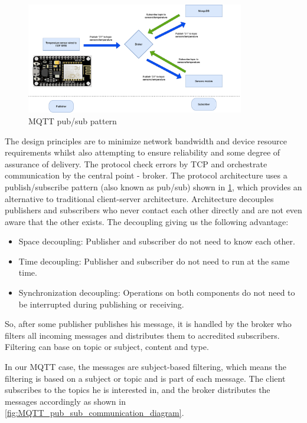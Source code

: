 \begin{figure}[H]
	\centering
	\includegraphics[width=0.85\textwidth]{img/MQTT_pub_sub_pattern.png}
	\caption{MQTT pub/sub pattern}
	\label{fig:MQTT_pub_sub_pattern}
  \end{figure}

The design principles are to minimize network bandwidth and device resource requirements whilst also attempting to ensure reliability and some degree of assurance of delivery. The protocol check errors by TCP and orchestrate communication by the central point - broker. The protocol architecture uses a publish/subscribe pattern (also known as pub/sub) shown in \cref{fig:MQTT_pub_sub_pattern}, which provides an alternative to traditional client-server architecture. Architecture decouples publishers and subscribers who never contact each other directly and are not even aware that the other exists. The decoupling giving us the following advantage:

\begin{itemize}
	\item Space decoupling: Publisher and subscriber do not need to know each other.
	\item Time decoupling: Publisher and subscriber do not need to run at the same time.
	\item Synchronization decoupling: Operations on both components do not need to be interrupted during publishing or receiving.
\end{itemize}

So, after some publisher publishes his message, it is handled by the broker who filters all incoming messages and distributes them to accredited subscribers. Filtering can base on topic or subject, content and type.

In our MQTT case, the messages are subject-based filtering, which means the filtering is based on a subject or topic and is part of each message. The client subscribes to the topics he is interested in, and the broker distributes the messages accordingly as shown in \cref{fig:MQTT_pub_sub_communication_diagram}.

